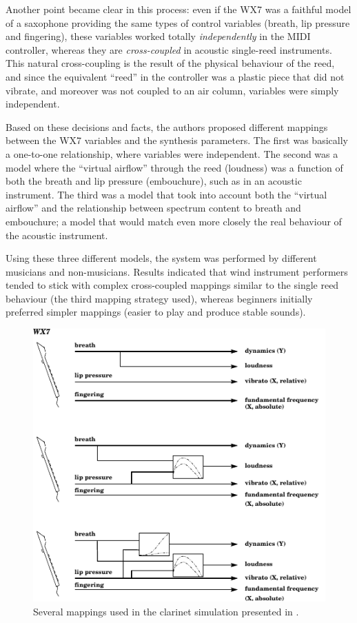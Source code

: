 Another point became clear in this process: even if the WX7 was a faithful model
of a saxophone providing the same types of control variables (breath, lip
pressure and fingering), these variables worked totally \textit{independently} in
the MIDI controller, whereas they are \textit{cross-coupled} in acoustic
single-reed instruments. This natural cross-coupling is the result of the
physical behaviour of the reed, and since the equivalent ``reed'' in the
controller was a plastic piece that did not vibrate, and moreover was not coupled
to an air column, variables were simply independent.

Based on these decisions and facts, the authors proposed different mappings
between the WX7 variables and the synthesis parameters.  The first was basically
a one-to-one relationship, where variables were independent.  The second was a
model where the ``virtual airflow'' through the reed (loudness) was a function of
both the breath and lip pressure (embouchure), such as in an acoustic instrument.
 The third was a model that took into account both the ``virtual airflow'' and
the relationship between spectrum content to breath and embouchure; a model that
would match even more closely the real behaviour of the acoustic instrument.

Using these three different models, the system was performed by different
musicians and non-musicians. Results indicated that wind instrument performers
tended to stick with complex cross-coupled mappings similar to the single reed
behaviour (the third mapping strategy used), whereas beginners initially
preferred simpler mappings (easier to play and produce stable sounds).


\begin{figure}[t]
\centering
\includegraphics[width=\textwidth]{img-1-eps-converted-to-crop.pdf}
\caption{Several mappings used in the clarinet simulation presented in
 \cite{Rovan:1997}.}
\label{Hunt:img-1}       %
\end{figure}


